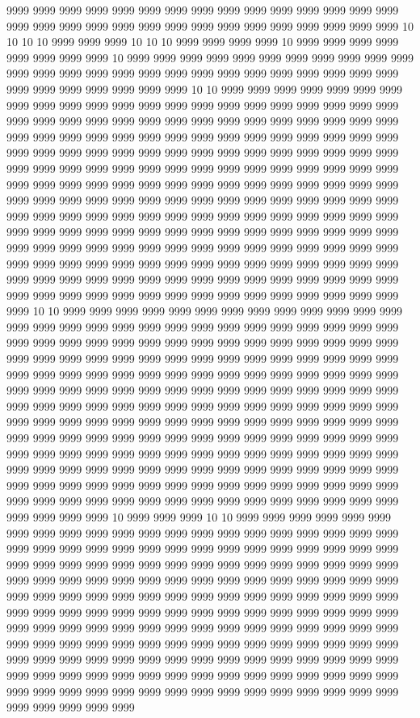 9999 9999 9999 9999 9999 9999 9999 9999 9999 9999 9999 9999 9999 9999 9999 9999 9999 9999 9999 9999 9999 9999 9999 9999 9999 9999 9999 9999 9999 9999 10 10 10 10 9999 9999 9999 10 10 10 9999 9999 9999 9999 10 9999 9999 9999 9999 9999 9999 9999 9999 10 9999 9999 9999 9999 9999 9999 9999 9999 9999 9999 9999 9999 9999 9999 9999 9999 9999 9999 9999 9999 9999 9999 9999 9999 9999 9999 9999 9999 9999 9999 9999 9999 9999 10 10 9999 9999 9999 9999 9999 9999 9999 9999 9999 9999 9999 9999 9999 9999 9999 9999 9999 9999 9999 9999 9999 9999 9999 9999 9999 9999 9999 9999 9999 9999 9999 9999 9999 9999 9999 9999 9999 9999 9999 9999 9999 9999 9999 9999 9999 9999 9999 9999 9999 9999 9999 9999 9999 9999 9999 9999 9999 9999 9999 9999 9999 9999 9999 9999 9999 9999 9999 9999 9999 9999 9999 9999 9999 9999 9999 9999 9999 9999 9999 9999 9999 9999 9999 9999 9999 9999 9999 9999 9999 9999 9999 9999 9999 9999 9999 9999 9999 9999 9999 9999 9999 9999 9999 9999 9999 9999 9999 9999 9999 9999 9999 9999 9999 9999 9999 9999 9999 9999 9999 9999 9999 9999 9999 9999 9999 9999 9999 9999 9999 9999 9999 9999 9999 9999 9999 9999 9999 9999 9999 9999 9999 9999 9999 9999 9999 9999 9999 9999 9999 9999 9999 9999 9999 9999 9999 9999 9999 9999 9999 9999 9999 9999 9999 9999 9999 9999 9999 9999 9999 9999 9999 9999 9999 9999 9999 9999 9999 9999 9999 9999 9999 9999 9999 9999 9999 9999 9999 9999 9999 9999 9999 9999 9999 9999 9999 9999 9999 9999 9999 9999 9999 9999 9999 10 10 9999 9999 9999 9999 9999 9999 9999 9999 9999 9999 9999 9999 9999 9999 9999 9999 9999 9999 9999 9999 9999 9999 9999 9999 9999 9999 9999 9999 9999 9999 9999 9999 9999 9999 9999 9999 9999 9999 9999 9999 9999 9999 9999 9999 9999 9999 9999 9999 9999 9999 9999 9999 9999 9999 9999 9999 9999 9999 9999 9999 9999 9999 9999 9999 9999 9999 9999 9999 9999 9999 9999 9999 9999 9999 9999 9999 9999 9999 9999 9999 9999 9999 9999 9999 9999 9999 9999 9999 9999 9999 9999 9999 9999 9999 9999 9999 9999 9999 9999 9999 9999 9999 9999 9999 9999 9999 9999 9999 9999 9999 9999 9999 9999 9999 9999 9999 9999 9999 9999 9999 9999 9999 9999 9999 9999 9999 9999 9999 9999 9999 9999 9999 9999 9999 9999 9999 9999 9999 9999 9999 9999 9999 9999 9999 9999 9999 9999 9999 9999 9999 9999 9999 9999 9999 9999 9999 9999 9999 9999 9999 9999 9999 9999 9999 9999 9999 9999 9999 9999 9999 9999 9999 9999 9999 9999 9999 9999 9999 9999 9999 9999 9999 9999 9999 9999 9999 9999 9999 9999 9999 9999 9999 9999 9999 9999 9999 9999 10 9999 9999 9999 10 10 9999 9999 9999 9999 9999 9999 9999 9999 9999 9999 9999 9999 9999 9999 9999 9999 9999 9999 9999 9999 9999 9999 9999 9999 9999 9999 9999 9999 9999 9999 9999 9999 9999 9999 9999 9999 9999 9999 9999 9999 9999 9999 9999 9999 9999 9999 9999 9999 9999 9999 9999 9999 9999 9999 9999 9999 9999 9999 9999 9999 9999 9999 9999 9999 9999 9999 9999 9999 9999 9999 9999 9999 9999 9999 9999 9999 9999 9999 9999 9999 9999 9999 9999 9999 9999 9999 9999 9999 9999 9999 9999 9999 9999 9999 9999 9999 9999 9999 9999 9999 9999 9999 9999 9999 9999 9999 9999 9999 9999 9999 9999 9999 9999 9999 9999 9999 9999 9999 9999 9999 9999 9999 9999 9999 9999 9999 9999 9999 9999 9999 9999 9999 9999 9999 9999 9999 9999 9999 9999 9999 9999 9999 9999 9999 9999 9999 9999 9999 9999 9999 9999 9999 9999 9999 9999 9999 9999 9999 9999 9999 9999 9999 9999 9999 9999 9999 9999 9999 9999 9999 9999 9999 9999 9999 9999 9999 